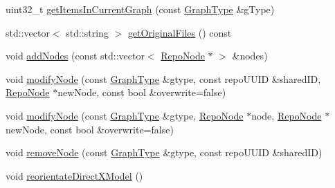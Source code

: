 \begin{DoxyCompactItemize}
\item 
uint32\+\_\+t \hyperlink{classrepo_1_1core_1_1model_1_1_repo_scene_a924528da9d4453284e722b0dc0ca0076}{get\+Items\+In\+Current\+Graph} (const \hyperlink{classrepo_1_1core_1_1model_1_1_repo_scene_aefcacd6eb4c7774ac1bfe3a6b223337c}{Graph\+Type} \&g\+Type)
\item 
std\+::vector$<$ std\+::string $>$ \hyperlink{classrepo_1_1core_1_1model_1_1_repo_scene_a70ca262465b114957590e563b9a0b2d8}{get\+Original\+Files} () const 
\item 
void \hyperlink{classrepo_1_1core_1_1model_1_1_repo_scene_ae0c048bf0904aab3b1f162082724b640}{add\+Nodes} (const std\+::vector$<$ \hyperlink{classrepo_1_1core_1_1model_1_1_repo_node}{Repo\+Node} $\ast$ $>$ \&nodes)
\item 
void \hyperlink{classrepo_1_1core_1_1model_1_1_repo_scene_acf00d158389dc84cc227f2208f053c9b}{modify\+Node} (const \hyperlink{classrepo_1_1core_1_1model_1_1_repo_scene_aefcacd6eb4c7774ac1bfe3a6b223337c}{Graph\+Type} \&gtype, const repo\+U\+U\+I\+D \&shared\+I\+D, \hyperlink{classrepo_1_1core_1_1model_1_1_repo_node}{Repo\+Node} $\ast$new\+Node, const bool \&overwrite=false)
\item 
void \hyperlink{classrepo_1_1core_1_1model_1_1_repo_scene_a932e31fc1448fe8d2bf57c1165cad076}{modify\+Node} (const \hyperlink{classrepo_1_1core_1_1model_1_1_repo_scene_aefcacd6eb4c7774ac1bfe3a6b223337c}{Graph\+Type} \&gtype, \hyperlink{classrepo_1_1core_1_1model_1_1_repo_node}{Repo\+Node} $\ast$node, \hyperlink{classrepo_1_1core_1_1model_1_1_repo_node}{Repo\+Node} $\ast$new\+Node, const bool \&overwrite=false)
\item 
void \hyperlink{classrepo_1_1core_1_1model_1_1_repo_scene_aa51d6a21aaed1aa223ea5413c5c7c853}{remove\+Node} (const \hyperlink{classrepo_1_1core_1_1model_1_1_repo_scene_aefcacd6eb4c7774ac1bfe3a6b223337c}{Graph\+Type} \&gtype, const repo\+U\+U\+I\+D \&shared\+I\+D)
\item 
void \hyperlink{classrepo_1_1core_1_1model_1_1_repo_scene_a49f78b7c17b6e7b4f37a4837edc44e64}{reorientate\+Direct\+X\+Model} ()
\end{DoxyCompactItemize}
